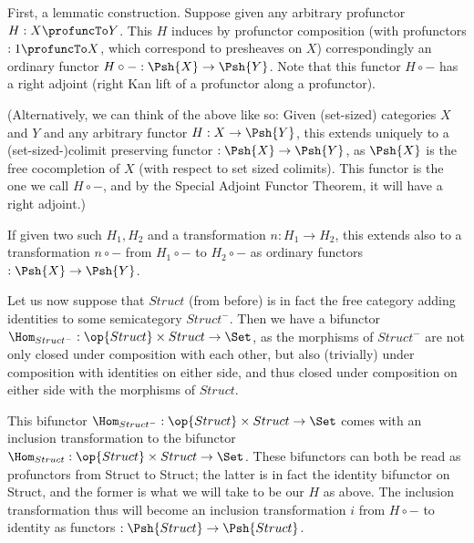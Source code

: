 First, a lemmatic construction. Suppose given any arbitrary profunctor $H : X \profuncTo Y$. This $H$ induces by profunctor composition (with profunctors $:1 \profuncTo X$, which correspond to presheaves on $X$) correspondingly an ordinary functor $H \circ - : \Psh{X} \to \Psh{Y}$. Note that this functor $H \circ -$ has a right adjoint (right Kan lift of a profunctor along a profunctor).

(Alternatively, we can think of the above like so: Given (set-sized) categories $X$ and $Y$ and any arbitrary functor $H : X \to \Psh{Y}$, this extends uniquely to a (set-sized-)colimit preserving functor $: \Psh{X} \to \Psh{Y}$, as $\Psh{X}$ is the free cocompletion of $X$ (with respect to set sized colimits). This functor is the one we call $H \circ -$, and by the Special Adjoint Functor Theorem, it will have a right adjoint.)


If given two such $H_1, H_2$ and a transformation $n : H_1 \to H_2$, this extends also to a transformation $n \circ -$ from $H_1 \circ -$ to $H_2 \circ -$ as ordinary functors $: \Psh{X} \to \Psh{Y}$.

Let us now suppose that $Struct$ (from before) is in fact the free category adding identities to some semicategory $Struct^-$. Then we have a bifunctor $\Hom_{Struct^-} : \op{Struct} \times Struct \to \Set$, as the morphisms of $Struct^-$ are not only closed under composition with each other, but also (trivially) under composition with identities on either side, and thus closed under composition on either side with the morphisms of $Struct$. 

This bifunctor $\Hom_{Struct^-} : \op{Struct} \times Struct \to \Set$ comes with an inclusion transformation to the bifunctor $\Hom_{Struct} : \op{Struct} \times Struct \to \Set$. These bifunctors can both be read as profunctors from Struct to Struct; the latter is in fact the identity bifunctor on Struct, and the former is what we will take to be our $H$ as above. The inclusion transformation thus will become an inclusion transformation $i$ from $H \circ -$ to identity as functors $: \Psh{Struct} \to \Psh{Struct}$.


